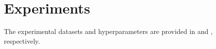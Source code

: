 \section{Experiments}
The experimental datasets and hyperparameters are provided in  and , respectively.

\begin{table*}[htbp]
  \centering
\caption{The overall performance of \our\ models on the three public datasets, and the best results are heightened in \textbf{bold} font. Numbers in parentheses are IQRs. $^{\dagger}$ indicates the results are the best performance in multiple runs, while other methods report the average performance; $^{\ddagger}$ indicates the experimental results of the models implemented by us. The introduction of compared models is available in . }
\end{table*}
